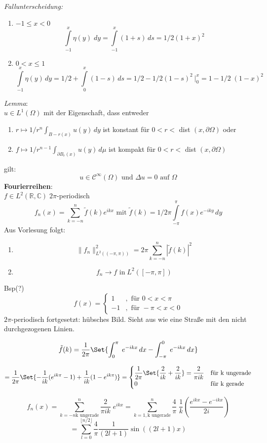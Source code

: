 \documentclass[11pt]{memoir}
\newcommand{\dom}{\partial\Omega}
\begin{document}
\emph{Fallunterscheidung:}
\begin{enumerate}
	\item $-1 \leq x < 0$		
	$$\int\limits_{-1}^x \eta (y) \;dy = \int\limits_{-1}^x (1+s) \, ds = 1/2 (1+x)^2$$
	\item $0 < x \leq 1$
	$$\int\limits_{-1}^x \eta(y) \, dy = 1/2 + \int\limits_0^x (1-s) \, ds = 1/2 - 1/2 (1 - s)^2 \ \bigg\vert ^x_0 = 1 - 1/2\;(1-x)^2$$
\end{enumerate}
\emph{Lemma}: \\
$u \in L^1(\Omega)$ mit der Eigenschaft, dass entweder
\begin{enumerate}
	\item $ r \mapsto 1/r^n \int_{B-r(x)} u(y) \, dy$ ist konstant für $0 < r <  $ dist $(x, \dom)$ oder
	\item $f \mapsto 1/r^{n-1} \int_{\partial B_r(x)} u(y) \, d\mu$ ist kompakt für $0 < r <  $ dist $(x, \dom)$
\end{enumerate}
gilt:
$$u \in \mathscr C^\infty(\Omega) \text{ und }\Delta u = 0 \text{ auf  }\Omega$$
\textbf{Fourierreihen}: \\
$f \in L^2(\mathbb R, \mathbb C) \;2\pi$-periodisch 
$$f_n(x) = \sum\limits_{k=-n}^n \tilde{f}(k) e^{ikx} \text{ mit }\tilde{f}(k) = 1/2\pi \int\limits_{-\pi}^\pi f(x) e^{-iky} \, dy$$
Aus Vorlesung folgt:
\begin{enumerate}
	\item $$\|f_n\|^2_{L^2((-\pi, \pi))} = 2\pi \sum\limits_{k=-n}^n |\tilde{f}(k)|^2$$ 
	\item $$f_n \rightarrow f \text{ in} \;L^2([-\pi, \pi])$$
\end{enumerate}

Bsp(?)
\begin{equation}
	f(x) = 
	\begin{cases}
		1 & , \text{ für }0 < x < \pi \\
		-1 & , \text{ für } -\pi < x < 0
	\end{cases}
\end{equation}
$2\pi$-periodisch fortgesetzt: hübsches Bild. Sieht aus wie eine Straße mit den nicht durchgezogenen Linien. \\
\par

$$\tilde{f}(k) = \dfrac{1}{2\pi} \Set{\int_0^\pi \;e^{-ikx} \, dx - \int^0_{-\pi}\; e^{-ikx} \, dx}$$
\par
\begin{equation}
	= \dfrac{1}{2\pi} \Set{-\dfrac{1}{ik}(e^{ik\pi} - 1) + \dfrac{1}{ik}(1- e^{ik\pi})} =
	\begin{cases}
		\dfrac{1}{2\pi} \Set{\dfrac{2}{ik} + \dfrac{2}{ik}} = \dfrac{2}{\pi ik} & \text{für k ungerade} \\
		0 & \text{für k gerade}
	\end{cases}
\end{equation}


$$f_n(x) = \sum\limits_{k=-n\text{k ungerade}}^n \dfrac{2}{\pi i k} \;e^{ikx} = \sum\limits_{k=1, \text{k ungerade}}^n \dfrac{4}{\pi} \;\dfrac{1}{k} \left(\dfrac{e^{ikx} - e^{-ikx}}{2i}\right) $$
$$= \sum\limits_{l=0}^{\lfloor n/2 \rfloor} \dfrac{4}{\pi} \dfrac{1}{(2l+1)}\sin((2l+1)x) $$
 
\end{document}
